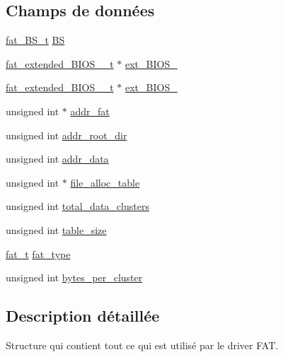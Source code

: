\subsection*{Champs de données}
\begin{DoxyCompactItemize}
\item 
\hyperlink{fat__internal_8h_a2fa84596abf5ea3bd6f27951a77333c5}{fat\-\_\-\-B\-S\-\_\-t} \hyperlink{struct__fat__info_adcd12930a4a7f94ecac42ba82567adb7}{B\-S}
\item 
\hyperlink{fat__internal_8h_a017a64d5b6e25780d01109008245c15c}{fat\-\_\-extended\-\_\-\-B\-I\-O\-S\-\_\-\_\-t} $\ast$ \hyperlink{struct__fat__info_a4da4c2a7a629ca59a686822e6447acb8}{ext\-\_\-\-B\-I\-O\-S\-\_}
\item 
\hyperlink{fat__internal_8h_ac3feb4afc4c75c10410e9e867e3f99e8}{fat\-\_\-extended\-\_\-\-B\-I\-O\-S\-\_\-\_\-t} $\ast$ \hyperlink{struct__fat__info_aab203e7eb3c2027e3034d7765a2d5281}{ext\-\_\-\-B\-I\-O\-S\-\_}
\item 
unsigned int $\ast$ \hyperlink{struct__fat__info_a0344193eb413dce4369b6e36ed03b92b}{addr\-\_\-fat}
\item 
unsigned int \hyperlink{struct__fat__info_ae9133d320e0afc89c5e6cc9cedf6dfb5}{addr\-\_\-root\-\_\-dir}
\item 
unsigned int \hyperlink{struct__fat__info_a4cb2766e74dd65f24d4eb30ce3b49302}{addr\-\_\-data}
\item 
unsigned int $\ast$ \hyperlink{struct__fat__info_a27195d09eb1dcd65d35d7b312d1bec0b}{file\-\_\-alloc\-\_\-table}
\item 
unsigned int \hyperlink{struct__fat__info_ab43681d4b5c7cf719cd6c934cada39e3}{total\-\_\-data\-\_\-clusters}
\item 
unsigned int \hyperlink{struct__fat__info_af110757af771c0f3fe0c515cca1ff177}{table\-\_\-size}
\item 
\hyperlink{fat__internal_8h_aea47744930623076e66d2f155e12ca24}{fat\-\_\-t} \hyperlink{struct__fat__info_af9e994d6d2c5211614ca61cfa4492500}{fat\-\_\-type}
\item 
unsigned int \hyperlink{struct__fat__info_ac1ba92d928512827ab7978f136efda96}{bytes\-\_\-per\-\_\-cluster}
\end{DoxyCompactItemize}


\subsection{Description détaillée}
Structure qui contient tout ce qui est utilisé par le driver F\-A\-T. 

